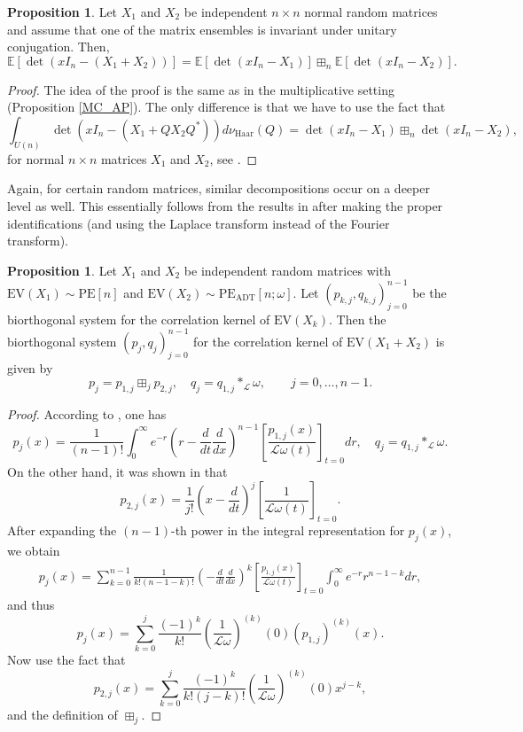 \documentclass[a4paper,12pt,oneside]{article}
\theoremstyle{definition}
\newtheorem{prop}[defi]{Proposition}
\newcommand{\om}{\omega}
\newcommand{\LT}[1]{\mathcal{L}#1}
\begin{document}
\begin{prop} \label{AC_AP}
    Let $X_1$ and $X_2$ be independent $n\times n$ normal random matrices and assume that one of the matrix ensembles is invariant under unitary conjugation. Then, 
    $$\mathbb{E}[\det(xI_n-(X_1+X_2))] = \mathbb{E}[\det(xI_n-X_1)] \boxplus_n \mathbb{E}[\det(xI_n-X_2)].$$
\end{prop}
\begin{proof}
    The idea of the proof is the same as in the multiplicative setting (Proposition \ref{MC_AP}). The only difference is that we have to use the fact that
    $$\int_{U(n)} \det(xI_n-(X_1+QX_2Q^\ast)) d\nu_{\text{Haar}}(Q) = \det(xI_n-X_1) \boxplus_n \det(xI_n-X_2),$$
    for normal $n\times n$ matrices $X_1$ and $X_2$, see \cite[Thm. 1.2]{MSS:fin_free_conv}.
\end{proof}


Again, for certain random matrices, similar decompositions occur on a deeper level as well. This essentially follows from the results in \cite{Kieburg:add_conv} after making the proper identifications (and using the Laplace transform instead of the Fourier transform).

\begin{prop} \label{AC_BS}
Let $X_1$ and $X_2$ be independent random matrices with $\text{EV}(X_1)\sim\text{PE}[n]$ and $\text{EV}(X_2)\sim\text{PE}_{\text{ADT}}[n;\om]$. Let $(p_{k,j},q_{k,j})_{j=0}^{n-1}$ be the biorthogonal system for the correlation kernel of $\text{EV}(X_k)$. Then the biorthogonal system $(p_{j},q_{j})_{j=0}^{n-1}$ for the correlation kernel of $\text{EV}(X_1+X_2)$ is given by
    $$ p_j = p_{1,j} \boxplus_{j} p_{2,j},\quad q_j = q_{1,j} \ast_{\LT{}} \om,\qquad j=0,\dots,n-1. $$
\end{prop}
\begin{proof}
According to \cite[Thm. III.8]{Kieburg:add_conv}, one has
    $$ p_j(x) = \frac{1}{(n-1)!} \int_0^\infty e^{-r} \left(r-\frac{d}{dt}\frac{d}{dx}\right)^{n-1}\left[\frac{p_{1,j}(x)}{\LT{\om}(t)}\right]_{t=0} dr,\quad  q_j =  q_{1,j} \ast_{\LT{}} \omega. $$
On the other hand, it was shown in \cite[Thm. III.1]{Kieburg:add_conv} that
    $$ p_{2,j}(x) = \frac{1}{j!}\left(x-\frac{d}{dt}\right)^j\left[\frac{1}{\LT{\om}(t)}\right]_{t=0}. $$
After expanding the $(n-1)$-th power in the integral representation for $p_j(x)$, we obtain
$$\begin{aligned}
    p_j(x) = \sum_{k=0}^{n-1} \frac{1}{k!(n-1-k)!} \left(-\frac{d}{dt}\frac{d}{dx}\right)^{k} \left[\frac{p_{1,j}(x)}{\LT{\om}(t)}\right]_{t=0} \int_0^\infty e^{-r} r^{n-1-k} dr,
\end{aligned}$$
and thus 
    $$ p_j(x) = \sum_{k=0}^{j} \frac{(-1)^k}{k!} \left(\frac{1}{\LT{\om}}\right)^{(k)}(0) (p_{1,j})^{(k)}(x).$$
Now use the fact that     
$$p_{2,j}(x) = \sum_{k=0}^j \frac{(-1)^k}{k!(j-k)!} \left(\frac{1}{\LT{\om}}\right)^{(k)}(0) x^{j-k}, $$
and the definition of $\boxplus_j$.
\end{proof}
\end{document}
